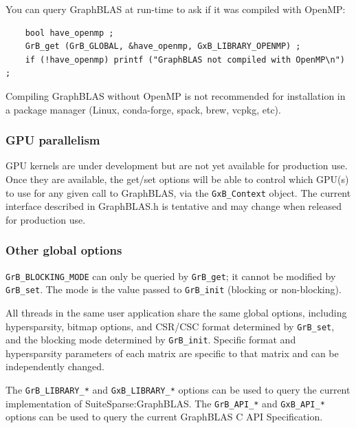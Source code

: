 You can query GraphBLAS at run-time to ask if it was compiled with OpenMP:

{\small
\begin{verbatim}
    bool have_openmp ;
    GrB_get (GrB_GLOBAL, &have_openmp, GxB_LIBRARY_OPENMP) ;
    if (!have_openmp) printf ("GraphBLAS not compiled with OpenMP\n") ; \end{verbatim}}

Compiling GraphBLAS without OpenMP is not recommended for installation in a
package manager (Linux, conda-forge, spack, brew, vcpkg, etc).

\subsubsection{GPU parallelism}
\label{gpu_parallelism}


GPU kernels are under development but are not yet available for production use.
Once they are available, the get/set options will be able to control which
GPU(s) to use for any given call to GraphBLAS, via the \verb'GxB_Context'
object.  The current interface described in GraphBLAS.h is tentative and
may change when released for production use.

\subsubsection{Other global options}

\verb'GrB_BLOCKING_MODE' can only be queried by \verb'GrB_get'; it cannot be
modified by \verb'GrB_set'.  The mode is the value passed to \verb'GrB_init'
(blocking or non-blocking).

All threads in the same user application share the same global options,
including hypersparsity, bitmap options, and CSR/CSC format determined by
\verb'GrB_set', and the blocking mode determined by \verb'GrB_init'.
Specific format and hypersparsity parameters of each matrix are specific to
that matrix and can be independently changed.

The \verb'GrB_LIBRARY_*' and \verb'GxB_LIBRARY_*' options can be used to query
the current implementation of SuiteSparse:GraphBLAS.  The \verb'GrB_API_*' and
\verb'GxB_API_*' options can be used to query the current GraphBLAS C API
Specification.

